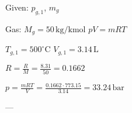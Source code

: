 Given:  
\( p_{g,1} \), \( m_g \)  

Gas:  
\( M_g = 50 \, \text{kg/kmol} \)  
\( pV = mRT \)  

\( T_{g,1} = 500^\circ \text{C} \)  
\( V_{g,1} = 3.14 \, \text{L} \)  

\( R = \frac{R}{M} = \frac{8.31}{50} = 0.1662 \)  

\( p = \frac{mRT}{V} = \frac{0.1662 \cdot 773.15}{3.14} = 33.24 \, \text{bar} \)  

---